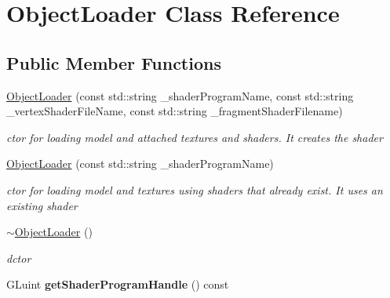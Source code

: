 \hypertarget{class_object_loader}{\section{Object\-Loader Class Reference}
\label{class_object_loader}
}
\subsection*{Public Member Functions}
\begin{DoxyCompactItemize}
\item 
\hypertarget{class_object_loader_ac28a22d6234864b00d3078bc1676a852}{\hyperlink{class_object_loader_ac28a22d6234864b00d3078bc1676a852}{Object\-Loader} (const std\-::string \-\_\-shader\-Program\-Name, const std\-::string \-\_\-vertex\-Shader\-File\-Name, const std\-::string \-\_\-fragment\-Shader\-Filename)}\label{class_object_loader_ac28a22d6234864b00d3078bc1676a852}

\begin{DoxyCompactList}\small\item\em ctor for loading model and attached textures and shaders. It creates the shader \end{DoxyCompactList}\item 
\hypertarget{class_object_loader_ac2397df02e74d50980604991fb772585}{\hyperlink{class_object_loader_ac2397df02e74d50980604991fb772585}{Object\-Loader} (const std\-::string \-\_\-shader\-Program\-Name)}\label{class_object_loader_ac2397df02e74d50980604991fb772585}

\begin{DoxyCompactList}\small\item\em ctor for loading model and textures using shaders that already exist. It uses an existing shader \end{DoxyCompactList}\item 
\hypertarget{class_object_loader_abe35e670f22d62f56a95e28b67b43c93}{\hyperlink{class_object_loader_abe35e670f22d62f56a95e28b67b43c93}{$\sim$\-Object\-Loader} ()}\label{class_object_loader_abe35e670f22d62f56a95e28b67b43c93}

\begin{DoxyCompactList}\small\item\em dctor \end{DoxyCompactList}\item 
\hypertarget{class_object_loader_a13165ae8f1c06aa6d2e42a25cce1ccbe}{G\-Luint {\bfseries get\-Shader\-Program\-Handle} () const }\label{class_object_loader_a13165ae8f1c06aa6d2e42a25cce1ccbe}


\end{DoxyCompactItemize}
